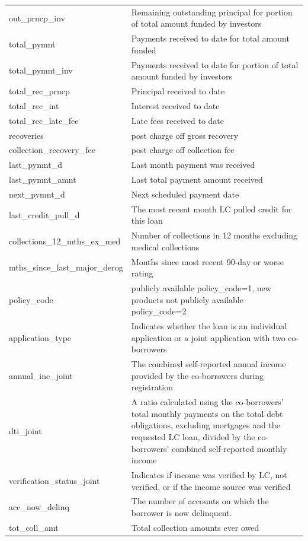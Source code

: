 \documentclass[11pt,]{report}
\begin{document}
\begin{longtable}[t]{>{\raggedright\arraybackslash}p{7cm}>{\raggedright\arraybackslash}p{7cm}}
\addlinespace
out\_prncp\_inv & Remaining outstanding principal for portion of total amount funded by investors\\
total\_pymnt & Payments received to date for total amount funded\\
total\_pymnt\_inv & Payments received to date for portion of total amount funded by investors\\
total\_rec\_prncp & Principal received to date\\
total\_rec\_int & Interest received to date\\
\addlinespace
total\_rec\_late\_fee & Late fees received to date\\
recoveries & post charge off gross recovery\\
collection\_recovery\_fee & post charge off collection fee\\
last\_pymnt\_d & Last month payment was received\\
last\_pymnt\_amnt & Last total payment amount received\\
\addlinespace
next\_pymnt\_d & Next scheduled payment date\\
last\_credit\_pull\_d & The most recent month LC pulled credit for this loan\\
collections\_12\_mths\_ex\_med & Number of collections in 12 months excluding medical collections\\
mths\_since\_last\_major\_derog & Months since most recent 90-day or worse rating\\
policy\_code & publicly available policy\_code=1, new products not publicly available policy\_code=2\\
\addlinespace
application\_type & Indicates whether the loan is an individual application or a joint application with two co-borrowers\\
annual\_inc\_joint & The combined self-reported annual income provided by the co-borrowers during registration\\
dti\_joint & A ratio calculated using the co-borrowers' total monthly payments on the total debt obligations, excluding mortgages and the requested LC loan, divided by the co-borrowers' combined self-reported monthly income\\
verification\_status\_joint & Indicates if income was verified by LC, not verified, or if the income source was verified\\
acc\_now\_delinq & The number of accounts on which the borrower is now delinquent.\\
\addlinespace
tot\_coll\_amt & Total collection amounts ever owed\\

\end{longtable}
\end{document}
